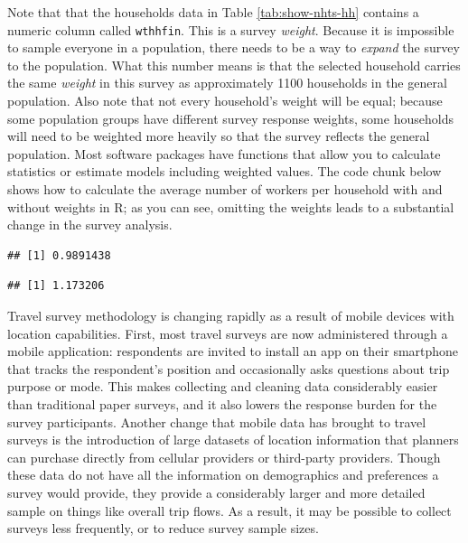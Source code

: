\documentclass[]{book}
\newenvironment{Shaded}{\begin{snugshade}}{\end{snugshade}}
\newcommand{\CommentTok}[1]{\textcolor[rgb]{0.56,0.35,0.01}{\textit{#1}}}
\newcommand{\KeywordTok}[1]{\textcolor[rgb]{0.13,0.29,0.53}{\textbf{#1}}}
\newcommand{\NormalTok}[1]{#1}
\newcommand{\OperatorTok}[1]{\textcolor[rgb]{0.81,0.36,0.00}{\textbf{#1}}}
\begin{document}
Note that that the households data in Table \ref{tab:show-nhts-hh} contains a
numeric column called \texttt{wthhfin}. This is a survey \emph{weight}. Because it is impossible
to sample everyone in a population, there needs to be a way to \emph{expand} the survey
to the population. What this number means is that the selected household carries
the same \emph{weight} in this survey as approximately 1100 households in the general
population. Also note that not every household's weight will be equal; because
some population groups have different survey response weights, some households
will need to be weighted more heavily so that the survey reflects the general
population. Most software packages have functions that allow you to
calculate statistics or estimate models including weighted values. The code
chunk below shows how to calculate the average number of workers per household
with and without weights in R; as you can see, omitting the weights leads
to a substantial change in the survey analysis.

\begin{Shaded}
\end{Shaded}

\begin{verbatim}
## [1] 0.9891438
\end{verbatim}

\begin{Shaded}
\end{Shaded}

\begin{verbatim}
## [1] 1.173206
\end{verbatim}

Travel survey methodology is changing rapidly as a result of mobile devices with
location capabilities. First, most travel surveys are now administered through a
mobile application: respondents are invited to install an app on their smartphone
that tracks the respondent's position and occasionally asks questions about
trip purpose or mode. This makes collecting and cleaning data considerably easier
than traditional paper surveys, and it also lowers the response burden for the
survey participants. Another change that mobile data has brought to travel surveys
is the introduction of large datasets of location information that planners can
purchase directly from cellular providers or third-party providers. Though these
data do not have all the information on demographics and preferences a survey
would provide, they provide a considerably larger and more detailed sample
on things like overall trip flows. As a result, it may be possible to collect
surveys less frequently, or to reduce survey sample sizes.
\end{document}
